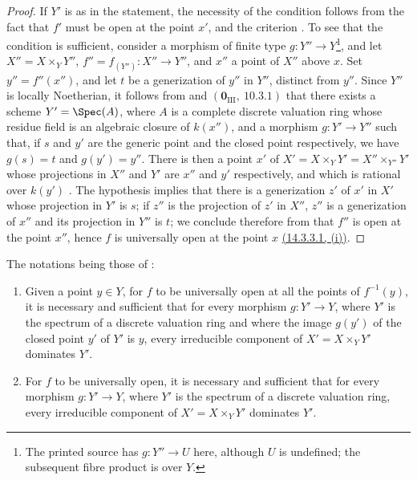 \begin{proof}
If $Y'$ is as in the statement, the necessity of the condition follows from the fact that $f'$ must be open at the point $x'$, and the criterion .
To see that the condition is sufficient, consider a morphism of finite type $g:Y''\to Y$\footnote{The printed source has $g:Y''\to U$ here, although $U$ is undefined; the subsequent fibre product is over $Y$.}, and let $X''=X\times_Y Y''$, $f''=f_{(Y'')}:X''\to Y''$, and $x''$ a point of $X''$ above $x$.
Set $y''=f''(x'')$, and let $t$ be a generization of $y''$ in $Y''$, distinct from $y''$.
Since $Y''$ is locally Noetherian, it follows from  and $(\mathbf{0}_{\mathrm{III}},~10.3.1)$ that there exists a scheme $Y'=\Spec(A)$, where $A$ is a complete discrete valuation ring whose residue field is an algebraic closure of $k(x'')$, and a morphism $g:Y'\to Y''$ such that, if $s$ and $y'$ are the generic point and the closed point respectively, we have $g(s)=t$ and $g(y')=y''$.
There is then a point $x'$ of $X'=X\times_Y Y'=X''\times_{Y''}Y'$ whose projections in $X''$ and $Y'$ are $x''$ and $y'$ respectively, and which is rational over $k(y')$ .
The hypothesis implies that there is a generization $z'$ of $x'$ in $X'$ whose projection in $Y'$ is $s$; if $z''$ is the projection of $z'$ in $X''$, $z''$ is a generization of $x''$ and its projection in $Y''$ is $t$; we conclude therefore from  that $f''$ is open at the point $x''$, hence $f$ is universally open at the point $x$ {\hyperlink{ega4.c04.subsec.14-3-3-1}{(14.3.3.1, (i))}}.
\end{proof}

\begin{corollary}[14.3.7]
\label{IV.14.3.7}
The notations being those of :
\begin{enumerate}[label=(\roman*)]
  \item Given a point $y\in Y$, for $f$ to be universally open at all the points of $f^{-1}(y)$, it is necessary and sufficient that for every morphism $g:Y'\to Y$, where $Y'$ is the spectrum of a discrete valuation ring and where the image $g(y')$ of the closed point $y'$ of $Y'$ is $y$, every irreducible component of $X'=X\times_Y Y'$ dominates $Y'$.
  \item For $f$ to be universally open, it is necessary and sufficient that for every morphism $g:Y'\to Y$, where $Y'$ is the spectrum of a discrete valuation ring, every irreducible component of $X'=X\times_Y Y'$ dominates $Y'$.
\end{enumerate}
\end{corollary}

